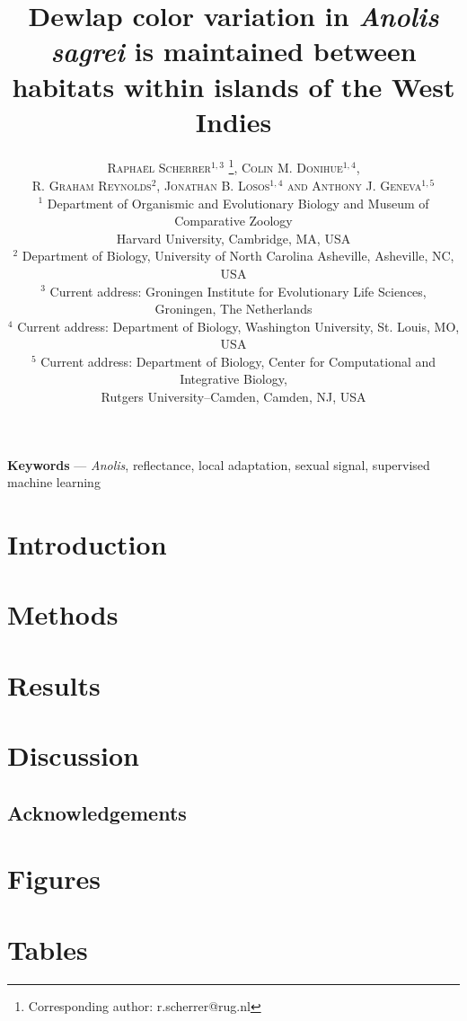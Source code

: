 \documentclass{article}
\title{Dewlap color variation in \textit{Anolis sagrei} is maintained between habitats within islands of the West Indies}
\author{
    \textsc{Rapha\"{e}l Scherrer$^{1,3}$ \thanks{Corresponding author: r.scherrer@rug.nl}, Colin M. Donihue$^{1,4}$, }\\
	\textsc{R. Graham Reynolds$^2$, Jonathan B. Losos$^{1,4}$ and Anthony J. Geneva$^{1,5}$} \\[1ex]
	\normalsize $^1$ Department of Organismic and Evolutionary Biology and Museum of Comparative Zoology \\ \normalsize Harvard University, Cambridge, MA, USA \\
	\normalsize $^2$ Department of Biology, University of North Carolina Asheville, Asheville, NC, USA\\ %
	\normalsize $^3$ Current address: Groningen Institute for Evolutionary Life Sciences,\\
	\normalsize Groningen, The Netherlands\\
	\normalsize $^4$ Current address: Department of Biology, Washington University, St. Louis, MO, USA\\
	\normalsize $^5$ Current address: Department of Biology, Center for Computational and Integrative Biology,\\ \normalsize Rutgers University--Camden, Camden, NJ, USA
}
\date{} %
\begin{document}
	
\linenumbers
	
\maketitle

\begin{abstract}
    
\end{abstract}

\textbf{Keywords} --- \textit{Anolis}, reflectance, local adaptation, sexual signal, supervised machine learning

\section*{Introduction}
	

	
\section*{Methods}


	
\section*{Results}



\section*{Discussion}


	
\subsection*{Acknowledgements}


	
\pagebreak

\section*{Figures}



\pagebreak

\section*{Tables}
\end{document}
